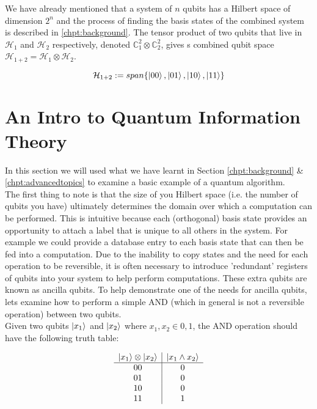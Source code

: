 We have already mentioned that a system of $n$ qubits has a Hilbert space of dimension $2^n$ and the process of finding the basis states of the combined system is described in \autoref{chpt:background}. The tensor product of two qubits that live in $\mathcal{H}_1$ and $\mathcal{H}_2$ respectively, denoted $\mathbb{C}_1^2 \otimes \mathbb{C}_2^2$, gives s combined qubit space $\mathcal{H_{1+2}} = \mathcal{H}_1\otimes \mathcal{H}_2$.

\begin{equation}
    \mathcal{H}_{1+2}:=span\{\left\vert{00}\right\rangle, \left\vert{01}\right\rangle, \left\vert{10}\right\rangle, \left\vert{11}\right\rangle\}
\end{equation}


\section{An Intro to Quantum Information Theory}

In this section we will used what we have learnt in Section \autoref{chpt:background} \& \autoref{chpt:advancedtopics} to examine a basic example of a quantum algorithm.\\

The first thing to note is that the size of you Hilbert space (i.e. the number of qubits you have) ultimately determines the domain over which a computation can be performed. This is intuitive because each (orthogonal) basis state provides an opportunity to attach a label that is unique to all others in the system. For example we could provide a database entry to each basis state that can then be fed into a computation. Due to the inability to copy states and the need for each operation to be reversible, it is often necessary to introduce 'redundant' registers of qubits into your system to help perform computations. These extra qubits are known as ancilla qubits. To help demonstrate one of the needs for ancilla qubits, lets examine how to perform a simple AND (which in general is not  a reversible operation) between two qubits.\\

Given two qubits $\left\vert{x_1}\right\rangle$ and $\left\vert{x_2}\right\rangle$ where $x_1, x_2\in {0,1}$, the AND operation should have the following truth table:

\begin{equation}
\begin{array}{c|c}
    \left\vert{x_1}\right\rangle \otimes \left\vert{x_2}\right\rangle & \left\vert{x_1\wedge x_2}\right\rangle \\
    \hline
    00 & 0 \\
    01 & 0 \\
    10 & 0 \\
    11 & 1 \\
\end{array}
\end{equation}

